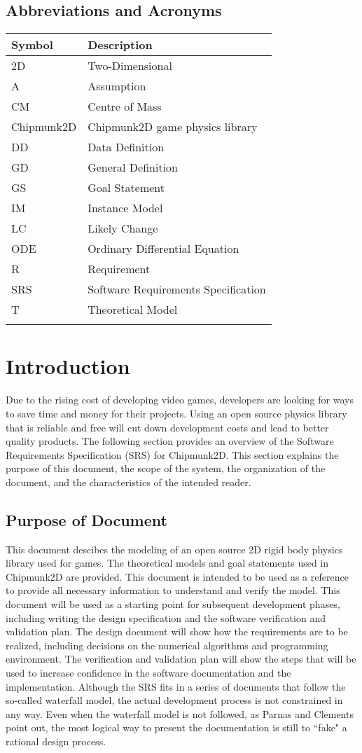 \documentclass[12pt]{article}
\begin{document}
\subsection{Abbreviations and Acronyms}
\label{Sec:AbbrandAcro}
\begin{longtable*}{l l}
\toprule
Symbol & Description
\\
\midrule
2D & Two-Dimensional
\\
A & Assumption
\\
CM & Centre of Mass
\\
Chipmunk2D & Chipmunk2D game physics library
\\
DD & Data Definition
\\
GD & General Definition
\\
GS & Goal Statement
\\
IM & Instance Model
\\
LC & Likely Change
\\
ODE & Ordinary Differential Equation
\\
R & Requirement
\\
SRS & Software Requirements Specification
\\
T & Theoretical Model
\\
\bottomrule
\label{Table:AbbrandAcro}
\end{longtable*}
\section{Introduction}
\label{Sec:Intr}
Due to the rising cost of developing video games, developers are looking for ways to save time and money for their projects. Using an open source physics library that is reliable and free will cut down development costs and lead to better quality products.
The following section provides an overview of the Software Requirements Specification (SRS) for Chipmunk2D. This section explains the purpose of this document, the scope of the system, the organization of the document, and the characteristics of the intended reader.
\subsection{Purpose of Document}
\label{Sec:PurpofDocu}
This document descibes the modeling of an open source 2D rigid body physics library used for games. The theoretical models and goal statements used in Chipmunk2D are provided. This document is intended to be used as a reference to provide all necessary information to understand and verify the model.
This document will be used as a starting point for subsequent development phases, including writing the design specification and the software verification and validation plan. The design document will show how the requirements are to be realized, including decisions on the numerical algorithms and programming environment. The verification and validation plan will show the steps that will be used to increase confidence in the software documentation and the implementation. Although the SRS fits in a series of documents that follow the so-called waterfall model, the actual development process is not constrained in any way. Even when the waterfall model is not followed, as Parnas and Clements point out, the most logical way to present the documentation is still to ``fake" a rational design process.
\end{document}

